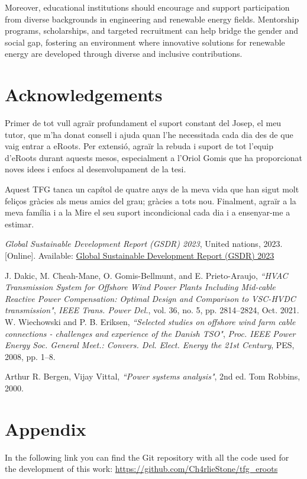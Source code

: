 \documentclass[a4paper,11pt, titlepage, twoside]{article}
\begin{document}
Moreover, educational institutions should encourage and support participation from diverse backgrounds in engineering and renewable energy fields. Mentorship programs, scholarships, and targeted recruitment can help bridge the gender and social gap, fostering an environment where innovative solutions for renewable energy are developed through diverse and inclusive contributions.


\section*{Acknowledgements}

Primer de tot vull agraïr profundament el suport constant del Josep, el meu tutor, que m'ha donat consell i ajuda quan
l'he necessitada cada dia des de que vaig entrar a eRoots. Per extensió, agraïr la rebuda i suport de tot l'equip d'eRoots durant aquests mesos,
especialment a l'Oriol Gomis que ha proporcionat noves idees i enfocs al desenvolupament de la tesi.\par

Aquest TFG tanca un capítol de quatre anys de la meva vida que han sigut molt feliços gràcies als meus amics del grau; gràcies a tots nou. 
Finalment, agraïr a la meva família i a la Mire el seu suport incondicional cada dia i a ensenyar-me a estimar.
 
 \begin{thebibliography}{99}\label{biblio}
 

 \textit{Global Sustainable Development Report (GSDR) 2023}, United nations, 2023. [Online]. 
 Available: \href{https://sdgs.un.org/gsdr/gsdr2023}{Global Sustainable Development Report (GSDR) 2023}
 
 {J. Dakic, M. Cheah-Mane, O. Gomis-Bellmunt, and E. Prieto-Araujo},
\textit{“HVAC Transmission System for Offshore Wind Power Plants Including
 Mid-cable Reactive Power Compensation: Optimal Design and Comparison to VSC-HVDC transmission"}, \textit{IEEE Trans. Power Del.}, vol. 36,
 no. 5, pp. 2814–2824, Oct. 2021.
 {W. Wiechowski and P. B. Eriksen},
\textit{“Selected studies on offshore wind farm
cable connections - challenges and experience of the Danish TSO"}, \textit{Proc.
IEEE Power Energy Soc. General Meet.: Convers. Del. Elect. Energy the
21st Century}, PES, 2008, pp. 1–8.

 {Arthur R. Bergen, Vijay Vittal},
\textit{“Power systems analysis"}, 2nd ed. Tom Robbins, 2000.

 

 \end{thebibliography}
 
\section*{Appendix}

In the following link you can find the Git repository with all the code used for the development of this work:
\url{https://github.com/Ch4rlieStone/tfg_eroots}
 
\end{document}

